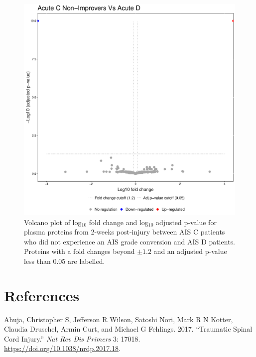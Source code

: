 \documentclass[9pt,lineno]{elife}
\newlength{\cslhangindent}
\newlength{\cslentryspacingunit} %
\newenvironment{CSLReferences}[2] %
 {%
  \setlength{\parindent}{0pt}
  \ifodd #1
  \let\oldpar\par
  \def\par{\hangindent=\cslhangindent\oldpar}
  \fi
  \setlength{\parskip}{#2\cslentryspacingunit}
 }%
 {}
\begin{document}
\begin{landscape}
\begin{landscape}
\begin{landscape}
\begin{landscape}
\begin{figure}
\includegraphics[width=1\linewidth]{figures/openms_protein_quantification/label_free/volcano_plots/openms_volcano_plot_2021-08-10_0014} \caption{Volcano plot of log\(_10\) fold change and log\(_10\) adjusted p-value for plasma proteins from 2-weeks post-injury between AIS C patients who did not experience an AIS grade conversion and AIS D patients. Proteins with a fold changes beyond \(\pm 1.2\) and an adjusted p-value less than 0.05 are labelled.}\label{fig:volc-plot-acute-c-nonimp-vs-acute-d}
\end{figure}

\hypertarget{references}{%
\section*{References}\label{references}}

\hypertarget{refs}{}
\begin{CSLReferences}{1}{0}
\leavevmode{}%
Ahuja, Christopher S, Jefferson R Wilson, Satoshi Nori, Mark R N Kotter, Claudia Druschel, Armin Curt, and Michael G Fehlings. 2017. {``Traumatic Spinal Cord Injury.''} \emph{Nat Rev Dis Primers} 3: 17018. \url{https://doi.org/10.1038/nrdp.2017.18}.


\end{CSLReferences}
\end{landscape}
\end{landscape}
\end{landscape}
\end{landscape}
\end{document}
